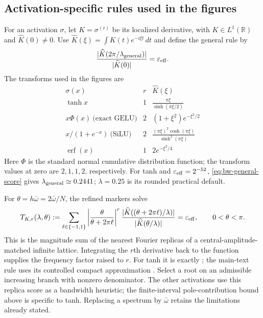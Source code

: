 \subsection{Activation-specific rules used in the figures}
\label{app:bw-general-rule}
For an activation $\sigma$, let $K=\sigma^{(r)}$ be its localized
derivative, with $K\in L^1(\mathbb R)$ and $\widehat K(0)\ne0$.
Use $\widehat K(\xi)=\int K(t)e^{-i\xi t}\,dt$ and define the general rule by
\begin{equation}
 \frac{|\widehat K(2\pi/\lambda_{\rm general})|}
 {|\widehat K(0)|}=\varepsilon_{\rm eff}.
 \label{eq:bw-general-score}
\end{equation}
The transforms used in the figures are
\begin{equation}
\begin{array}{c|c|c}
 \sigma(x)&r&\widehat K(\xi)\\\hline
 \tanh x&1&\displaystyle\frac{\pi\xi}{\sinh(\pi\xi/2)}\\[4pt]
 x\Phi(x)\ \text{(exact GELU)}&2&(1+\xi^2)e^{-\xi^2/2}\\[3pt]
 x/(1+e^{-x})\ \text{(SiLU)}&2&
 \displaystyle\frac{(\pi\xi)^2\cosh(\pi\xi)}{\sinh^2(\pi\xi)}\\[4pt]
 \operatorname{erf}(x)&1&2e^{-\xi^2/4}
\end{array}
\label{eq:bw-activation-transforms}
\end{equation}
Here $\Phi$ is the standard normal cumulative distribution function;
the transform values at zero are $2,1,1,2$, respectively.
For tanh and $\varepsilon_{\rm eff}=2^{-52}$,
\eqref{eq:bw-general-score} gives $\lambda_{\rm general}\simeq0.2441$;
$\lambda=0.25$ is its rounded practical default.

For $\theta=h\bar\omega=2\bar\omega/N$, the refined markers solve
\begin{equation}
 T_{K,r}(\lambda,\theta):=
 \sum_{\ell\in\{-1,1\}}
 \left|\frac{\theta}{\theta+2\pi\ell}\right|^r
 \frac{|\widehat K((\theta+2\pi\ell)/\lambda)|}
 {|\widehat K(\theta/\lambda)|}
 =\varepsilon_{\rm eff},\qquad 0<\theta<\pi.
 \label{eq:bw-general-refined}
\end{equation}
This is the magnitude sum of the nearest Fourier replicas of a
central-amplitude-matched infinite lattice. Integrating the $r$th derivative
back to the function supplies the frequency factor raised to $r$.
For tanh it is exactly ; the main-text rule uses
its controlled compact approximation .
Select a root on an admissible increasing branch with nonzero denominator.
The other activations use this replica score as a bandwidth heuristic;
the finite-interval pole-contribution bound above is specific to tanh.
Replacing a spectrum by $\bar\omega$ retains the limitations already stated.

